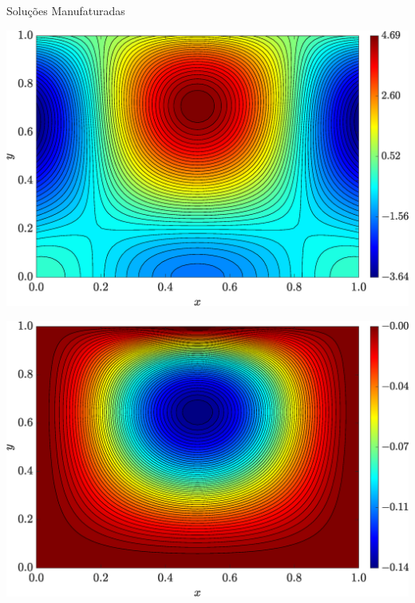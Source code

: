\begin{frame}{Soluções Manufaturadas}
    \centering
    \captionsetup{justification=centering}
    \label{fig:sol_manufaturadas_21}
    \begin{minipage}{0.48\textwidth}
        \centering
        \includegraphics[width=\textwidth]{Figures/Exact_Map_NormErr_2nd_Betann_0.1_Re_1_Wi_1_epsilon_0_xi_0_alphaG_0_Dt_1e-06_at_0.05_tipsim_1_MMS_12_Wz.eps}
        \label{fig_solexawzCase11}
    \end{minipage}
    \hfill
    \begin{minipage}{0.48\textwidth}
        \centering
        \includegraphics[width=\textwidth]{Figures/Exact_Map_NormErr_2nd_Betann_0.1_Re_1_Wi_1_epsilon_0_xi_0_alphaG_0_Dt_1e-06_at_0.05_tipsim_1_MMS_12_Psi.eps}
        \label{fig_solexapsiCase11}
    \end{minipage}
\end{frame}


